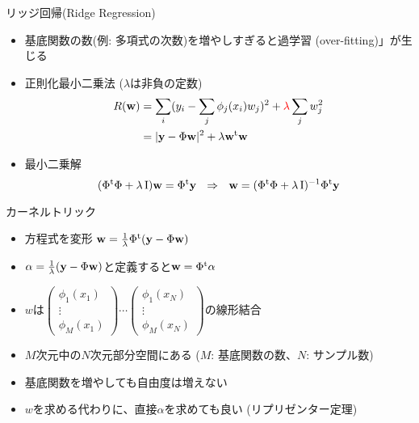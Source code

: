 \documentclass[dvipdfmx]{beamer}
\begin{document}
\begin{frame}[t,fragile]{リッジ回帰(Ridge Regression)}
  \begin{itemize}
    \setlength{\itemsep}{1em}
  \item 基底関数の数(例: 多項式の次数)を増やしすぎると過学習 (over-fitting)」が生じる
  \item 正則化最小二乗法 ($\lambda$は非負の定数)
    \begin{align*}
    R({\bf w}) &= \sum_i (y_i - \sum_j \phi_j(x_i) w_j)^2 + {\color{red} \lambda} \sum_j w_j^2 \\
    &= | {\bf y} - \Phi {\bf w} |^2 + \lambda {\bf w}^{\rm t} {\bf w}
    \end{align*}
  \item 最小二乗解
    \[
    (\Phi^{\rm t} \Phi + \lambda \, {\rm I}) {\bf w} = \Phi^{\rm t} {\bf y} \ \ \Rightarrow \ \ 
      {\bf w} = (\Phi^{\rm t} \Phi + \lambda \, {\rm I})^{-1}\Phi^{\rm t} {\bf y}
      \]
  \end{itemize}
\end{frame}


\begin{frame}[t,fragile]{カーネルトリック}
  \begin{itemize}
    \setlength{\itemsep}{1em}
  \item 方程式を変形 ${\bf w} = \frac{1}{\lambda} \Phi^{\rm t} ({\bf y} -\Phi {\bf w})$
  \item $\alpha = \frac{1}{\lambda}({\bf y} -\Phi {\bf w})$と定義すると${\bf w} =\Phi^{\rm t} \alpha$
    \item $w$は$\begin{pmatrix} \phi_1(x_1) \\ \vdots \\ \phi_M(x_1) \end{pmatrix} \cdots 
      \begin{pmatrix} \phi_1(x_N) \\ \vdots \\ \phi_M(x_N) \end{pmatrix}$の線形結合
    \item $M$次元中の$N$次元部分空間にある ($M$: 基底関数の数、$N$: サンプル数)
    \item 基底関数を増やしても自由度は増えない
    \item $w$を求める代わりに、直接$\alpha$を求めても良い (リプリゼンター定理)
  \end{itemize}
\end{frame}
\end{document}
